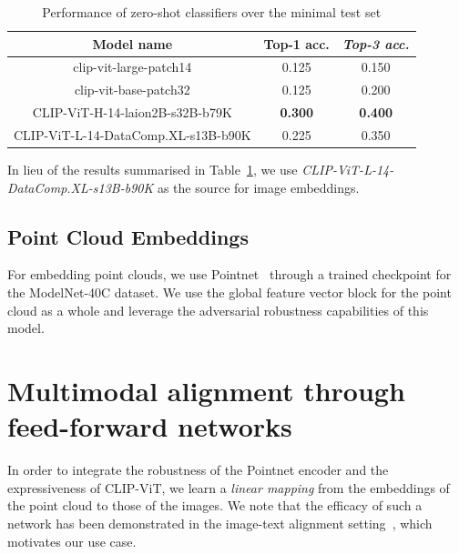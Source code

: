 \documentclass[letterpaper, 10 pt, conference]{ieeeconf}  %
\begin{document}
\begin{table}[!h]
\vspace{-2mm}
\caption{Performance of zero-shot classifiers over the minimal test set}
\vspace{-4mm}
\label{zero-shot:metrics}
\begin{center}
\begin{tabular}{|c|c|c|}
\hline
\textbf{Model name} & \textbf{Top-1 acc.} & \textit{Top-3 acc.} \\
\hline
clip-vit-large-patch14 & 0.125 & 0.150 \\
\hline
clip-vit-base-patch32 & 0.125 & 0.200 \\
\hline
CLIP-ViT-H-14-laion2B-s32B-b79K & \textbf{0.300} & \textbf{0.400} \\
\hline
CLIP-ViT-L-14-DataComp.XL-s13B-b90K & 0.225 & 0.350 \\
\hline
\end{tabular}
\end{center}
\vspace{-6mm}
\end{table}

In lieu of the results summarised in Table~\ref{zero-shot:metrics}, we use \textit{CLIP-ViT-L-14-DataComp.XL-s13B-b90K} as the source for image embeddings.

\subsection{Point Cloud Embeddings}
\label{point-cloud:embeddings}

For embedding point clouds, we use Pointnet~\cite{Qi_2017_CVPR} through a trained checkpoint for the ModelNet-40C dataset. We use the global feature vector block for the point cloud as a whole and leverage the adversarial robustness capabilities of this model. 

\section{Multimodal alignment through feed-forward networks}
\label{alignment}

In order to integrate the robustness of the Pointnet encoder and the expressiveness of CLIP-ViT, we learn a \textit{linear mapping} from the embeddings of the point cloud to those of the images. We note that the efficacy of such a network has been demonstrated in the image-text alignment setting~\cite{merullo2023linearly}, which motivates our use case.
\end{document}
